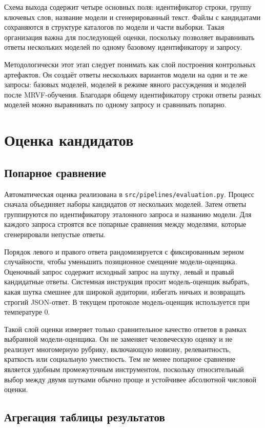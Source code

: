 Схема выхода содержит четыре основных поля: идентификатор строки, группу ключевых слов, название модели и сгенерированный текст. Файлы с кандидатами сохраняются в структуре каталогов по модели и части выборки. Такая организация важна для последующей оценки, поскольку позволяет выравнивать ответы нескольких моделей по одному базовому идентификатору и запросу.

Методологически этот этап следует понимать как слой построения контрольных артефактов. Он создаёт ответы нескольких вариантов модели на одни и те же запросы: базовых моделей, моделей в режиме явного рассуждения и моделей после MRVF-обучения. Благодаря общему идентификатору строки ответы разных моделей можно выравнивать по одному запросу и сравнивать попарно.

\section{Оценка кандидатов}

\subsection{Попарное сравнение}

Автоматическая оценка реализована в \texttt{src/pipelines/evaluation.py}. Процесс сначала объединяет наборы кандидатов от нескольких моделей. Затем ответы группируются по идентификатору эталонного запроса и названию модели. Для каждого запроса строятся все попарные сравнения между моделями, которые сгенерировали непустые ответы.

Порядок левого и правого ответа рандомизируется с фиксированным зерном случайности, чтобы уменьшить позиционное смещение модели-оценщика. Оценочный запрос содержит исходный запрос на шутку, левый и правый кандидатные ответы. Системная инструкция просит модель-оценщик выбрать, какая шутка смешнее для широкой аудитории, избегать ничьих и возвращать строгий JSON-ответ. В текущем протоколе модель-оценщик используется при температуре \(0\).

Такой слой оценки измеряет только сравнительное качество ответов в рамках выбранной модели-оценщика. Он не заменяет человеческую оценку и не реализует многомерную рубрику, включающую новизну, релевантность, краткость или социальную уместность. Тем не менее попарное сравнение является удобным промежуточным инструментом, поскольку относительный выбор между двумя шутками обычно проще и устойчивее абсолютной числовой оценки.

\subsection{Агрегация таблицы результатов}

